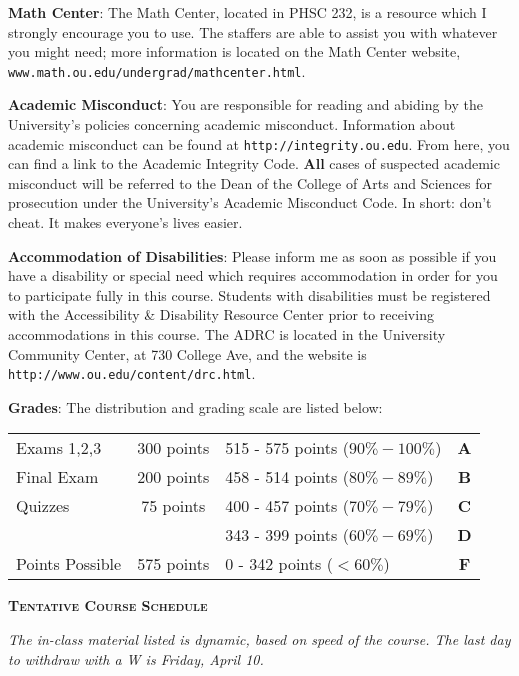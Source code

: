 \documentclass[notes]{subfiles}
\begin{document}
\begin{flushleft}
\textbf{Math Center}: 
	The Math Center, located in PHSC 232, is a resource which I strongly encourage you to use.  The staffers are able to assist you with whatever you might need; more information is located on the Math Center website, \texttt{www.math.ou.edu/undergrad/mathcenter.html}.
\\ \medskip

\textbf{Academic Misconduct}: 
	You are responsible for reading and abiding by the University's policies concerning academic misconduct. Information about academic misconduct can be found at \texttt{http://integrity.ou.edu}.  From here, you can find a link to the Academic Integrity Code.  \textbf{All} cases of suspected academic misconduct will be referred to the Dean of the College of Arts and Sciences for prosecution under the University's Academic Misconduct Code. In short: don't cheat.  It makes everyone's lives easier.
\\ \medskip
	
\textbf{Accommodation of Disabilities}: 
	Please inform me as soon as possible if you have a disability or special need which requires accommodation in order for you to participate fully in this course. Students with disabilities must be registered with the Accessibility \& Disability Resource Center prior to receiving accommodations in this course. The ADRC is located in the University Community Center, at 730 College Ave, and the website is \texttt{http://www.ou.edu/content/drc.html}. \\ \medskip

\textbf{Grades}: 
	The distribution and grading scale are listed below:
	\begin{center}
		\begin{tabular}{|lc||l||c|} \hline
			Exams 1,2,3 	& 300 points		& 515 - 575 points ($90\% - 100\%$) & \textbf{A}\\
			Final Exam 		& 200 points 		& 458 - 514 points ($80\% - 89\%$)	& \textbf{B}\\
			Quizzes 	 	& 75 points			& 400 - 457 points ($70\% - 79\%$)	& \textbf{C}\\
  							&					& 343 - 399 points ($60\% - 69\%$)	& \textbf{D}\\\hline
			Points Possible	& 575 points		& 0 - 342 points ($< 60\%$)			& \textbf{F}  \\ \hline
		\end{tabular}
	\end{center}
		\newpage
		
		\thispagestyle{empty}
	\begin{center}
		\textsc{\textbf{Tentative Course Schedule}}
	\end{center}
		\emph{The in-class material listed is dynamic, based on speed of the course.  The last day to withdraw with a W is Friday, April 10.}
		

\end{flushleft}
\end{document}

